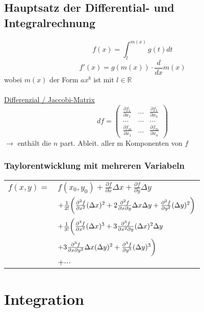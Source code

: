 
\subsection{Hauptsatz der Differential- und Integralrechnung}

\begin{equation*}
f(x)=\int^{m(x)}_lg(t)dt
\end{equation*}
\begin{equation*}
f'(x)=g(m(x))\cdot\frac{d}{dx}m(x)
\end{equation*}
wobei $m(x)$ der Form $ax^b$ ist mit $l\in \mathbb{R}$\\\\
\underline{Differenzial / Jaccobi-Matrix}
\begin{equation*}
df = 
\begin{pmatrix}
\frac{\partial f_1}{\partial x_1} & ... & \frac{\partial f_1}{\partial x_n} \\
... & ... & ... \\
\frac{\partial f_m}{\partial x_1} & ... & \frac{\partial f_m}{\partial x_n}
\end{pmatrix}
\end{equation*}
$\rightarrow$ enth{\"a}lt die $n$ part. Ableit. aller m Komponenten von $f$\\
\subsubsection*{Taylorentwicklung mit mehreren Variabeln} 
\begin{tabular}{ll}
	$f(x,y) =  $ & $f(x_0,y_0) + \frac{\partial f}{\partial x} \Delta x + \frac{\partial f}{\partial y} \Delta y$ \\
	& $ + \frac{1}{2!} \bigg{(}
	\frac{\partial^2 f}{\partial x^2} (\Delta x)^2	
	+ 2\frac{\partial^2 f}{\partial x \partial y} \Delta x \Delta y 
	+ \frac{\partial^2 f}{\partial y^2} (\Delta y)^2	
	\bigg{)} $ \\
	& $ + \frac{1}{3!} \bigg{(}
	\frac{\partial^3 f}{\partial x^3} (\Delta x)^3
	+ 3\frac{\partial^3 f}{\partial x^2 \partial y} (\Delta x)^2 \Delta y$ \\
	&			\qquad  $+ 3\frac{\partial^3 f}{\partial x \partial y^2} \Delta x (\Delta y)^2 
	+ \frac{\partial^3 f}{\partial y^3} (\Delta y)^3
	\bigg{)} $ \\
	& 			$+ \cdots$			
	
\end{tabular}

\section{Integration}


